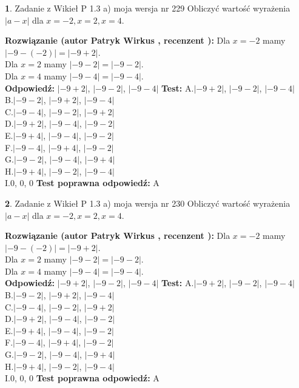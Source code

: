 \documentclass[12pt, a4paper]{article}
\theoremstyle{definition} %
\newtheorem{zad}{}
\newcommand{\zadStart}[1]{\begin{zad}#1\newline}
\newcommand{\zadStop}{\end{zad}}
\newcommand{\rozwStart}[2]{\noindent \textbf{Rozwiązanie (autor #1 , recenzent #2): }\newline}
\newcommand{\rozwStop}{\newline}
\newcommand{\odpStart}{\noindent \textbf{Odpowiedź:}\newline}
\newcommand{\odpStop}{\newline}
\newcommand{\testStart}{\noindent \textbf{Test:}\newline}
\newcommand{\testStop}{\newline}
\newcommand{\kluczStart}{\noindent \textbf{Test poprawna odpowiedź:}\newline}
\newcommand{\kluczStop}{\newline}
\begin{document}
\zadStart{Zadanie z Wikieł P 1.3 a) moja wersja nr 229}
Obliczyć wartość wyrażenia $|a - x|$ dla $x=-2,x=2,x=4$.
\zadStop
\rozwStart{Patryk Wirkus}{}
Dla $x = -2$ mamy $|-9 - (-2)| = |-9 + 2|$.\\
Dla $x = 2$ mamy $|-9 - 2| = |-9 - 2|$.\\
Dla $x = 4$ mamy $|-9 - 4| = |-9 - 4|$.\\
\rozwStop
\odpStart
$|-9 + 2|$, $|-9 - 2|$, $|-9 - 4|$
\odpStop
\testStart
A.$|-9 + 2|$, $|-9 - 2|$, $|-9 - 4|$\\
B.$|-9 - 2|$, $|-9 + 2|$, $|-9 - 4|$\\
C.$|-9 - 4|$, $|-9 - 2|$, $|-9 + 2|$\\
D.$|-9 + 2|$, $|-9 - 4|$, $|-9 - 2|$\\
E.$|-9 + 4|$, $|-9 - 4|$, $|-9 - 2|$\\
F.$|-9 - 4|$, $|-9 + 4|$, $|-9 - 2|$\\
G.$|-9 - 2|$, $|-9 - 4|$, $|-9 + 4|$\\
H.$|-9 + 4|$, $|-9 - 2|$, $|-9 - 4|$\\
I.$0$, $0$, $0$
\testStop
\kluczStart
A
\kluczStop



\zadStart{Zadanie z Wikieł P 1.3 a) moja wersja nr 230}
Obliczyć wartość wyrażenia $|a - x|$ dla $x=-2,x=2,x=4$.
\zadStop
\rozwStart{Patryk Wirkus}{}
Dla $x = -2$ mamy $|-9 - (-2)| = |-9 + 2|$.\\
Dla $x = 2$ mamy $|-9 - 2| = |-9 - 2|$.\\
Dla $x = 4$ mamy $|-9 - 4| = |-9 - 4|$.\\
\rozwStop
\odpStart
$|-9 + 2|$, $|-9 - 2|$, $|-9 - 4|$
\odpStop
\testStart
A.$|-9 + 2|$, $|-9 - 2|$, $|-9 - 4|$\\
B.$|-9 - 2|$, $|-9 + 2|$, $|-9 - 4|$\\
C.$|-9 - 4|$, $|-9 - 2|$, $|-9 + 2|$\\
D.$|-9 + 2|$, $|-9 - 4|$, $|-9 - 2|$\\
E.$|-9 + 4|$, $|-9 - 4|$, $|-9 - 2|$\\
F.$|-9 - 4|$, $|-9 + 4|$, $|-9 - 2|$\\
G.$|-9 - 2|$, $|-9 - 4|$, $|-9 + 4|$\\
H.$|-9 + 4|$, $|-9 - 2|$, $|-9 - 4|$\\
I.$0$, $0$, $0$
\testStop
\kluczStart
A
\kluczStop
\end{document}

